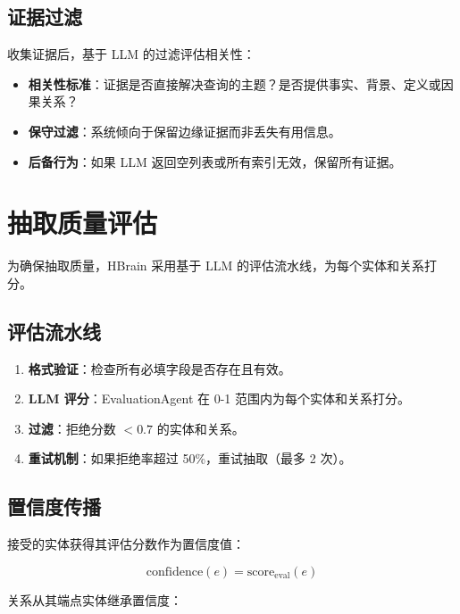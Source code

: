 \documentclass[11pt]{article}
\begin{document}
\subsection{证据过滤}

收集证据后，基于 LLM 的过滤评估相关性：

\begin{itemize}
    \item \textbf{相关性标准}：证据是否直接解决查询的主题？是否提供事实、背景、定义或因果关系？
    \item \textbf{保守过滤}：系统倾向于保留边缘证据而非丢失有用信息。
    \item \textbf{后备行为}：如果 LLM 返回空列表或所有索引无效，保留所有证据。
\end{itemize}

\section{抽取质量评估}
\label{sec:evaluation}

为确保抽取质量，HBrain 采用基于 LLM 的评估流水线，为每个实体和关系打分。

\subsection{评估流水线}

\begin{enumerate}
    \item \textbf{格式验证}：检查所有必填字段是否存在且有效。
    \item \textbf{LLM 评分}：EvaluationAgent 在 0-1 范围内为每个实体和关系打分。
    \item \textbf{过滤}：拒绝分数 $< 0.7$ 的实体和关系。
    \item \textbf{重试机制}：如果拒绝率超过 50\%，重试抽取（最多 2 次）。
\end{enumerate}

\subsection{置信度传播}

接受的实体获得其评估分数作为置信度值：

\begin{equation}
\text{confidence}(e) = \text{score}_{\text{eval}}(e)
\end{equation}

关系从其端点实体继承置信度：
\end{document}
